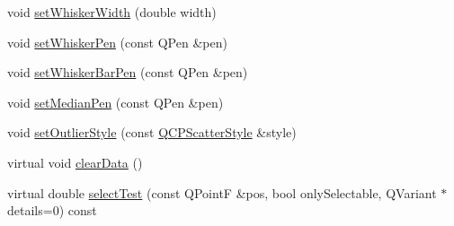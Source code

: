 \begin{DoxyCompactItemize}
void \hyperlink{class_q_c_p_statistical_box_adf378812446bd66f34d1f7f293d991cd}{set\+Whisker\+Width} (double width)
\item 
void \hyperlink{class_q_c_p_statistical_box_a4a5034cb3b9b040444df05ab1684620b}{set\+Whisker\+Pen} (const Q\+Pen \&pen)
\item 
void \hyperlink{class_q_c_p_statistical_box_aa8d3e503897788e1abf68dc74b5f147f}{set\+Whisker\+Bar\+Pen} (const Q\+Pen \&pen)
\item 
void \hyperlink{class_q_c_p_statistical_box_a7260ac55b669f5d0a74f16d5ca84c52c}{set\+Median\+Pen} (const Q\+Pen \&pen)
\item 
void \hyperlink{class_q_c_p_statistical_box_ad5241943422eb8e58360a97e99ad6aa7}{set\+Outlier\+Style} (const \hyperlink{class_q_c_p_scatter_style}{Q\+C\+P\+Scatter\+Style} \&style)
\item 
virtual void \hyperlink{class_q_c_p_statistical_box_a19112994449df0c20287858436cc68e3}{clear\+Data} ()
\item 
virtual double \hyperlink{class_q_c_p_statistical_box_a0153ac16326b94450afbca208e3f9961}{select\+Test} (const Q\+PointF \&pos, bool only\+Selectable, Q\+Variant $\ast$details=0) const
\end{DoxyCompactItemize}
